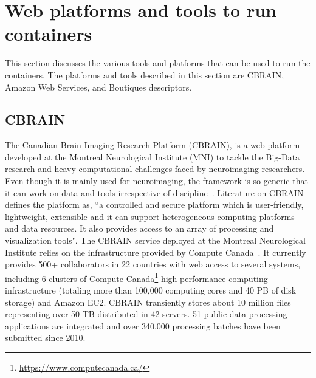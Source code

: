\section{Web platforms and tools to run containers}\label{web_platforms}
This section discusses the various tools and platforms that can be used to run the containers. The platforms and tools described in this section are CBRAIN, Amazon Web Services, and Boutiques descriptors.
\subsection{CBRAIN}
The Canadian Brain Imaging Research Platform (CBRAIN), is a web platform developed at the Montreal Neurological Institute (MNI) to tackle the Big-Data research and heavy computational challenges faced by neuroimaging researchers. Even though it is mainly used for neuroimaging, the framework is so generic that it can work on data and tools irrespective of discipline~\cite{DBLP:journals/fini/DasGRSPMSRSKMKR17}. Literature on CBRAIN~\cite{DBLP:journals/fini/DasGRSPMSRSKMKR17} defines the platform as, ``a controlled and secure platform which is user-friendly, lightweight, extensible and it can support heterogeneous computing platforms and data resources. It also provides access to an array of processing and visualization tools". The CBRAIN service deployed at the Montreal Neurological Institute relies on the infrastructure provided by Compute Canada~\cite{DAS20161188}. It currently provides 500+ collaborators in 22 countries with web access to several systems, including 6 clusters of Compute Canada\footnote{\url{https://www.computecanada.ca/}} high-performance computing infrastructure (totaling more than 100,000 computing cores and 40 PB of disk storage) and Amazon EC2. CBRAIN transiently stores about 10 million files representing over 50 TB distributed in 42 servers. 51 public data processing applications are integrated and over 340,000 processing batches have been submitted since 2010.

